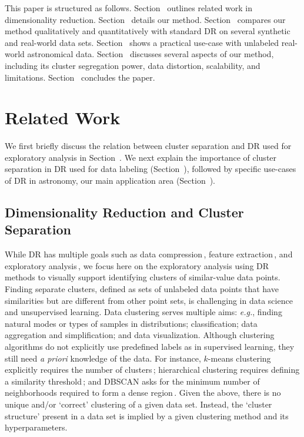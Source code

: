 \documentclass[sagev,Afour,times]{sagej}
\begin{document}
This paper is structured as follows. Section~ outlines related work in dimensionality reduction. Section~ details our method. Section~ compares our method qualitatively and quantitatively with standard DR on several synthetic and real-world data sets. Section~ shows a practical use-case with unlabeled real-world astronomical data. Section~ discusses several aspects of our method, including its cluster segregation power, data distortion, scalability, and limitations. Section~ concludes the paper.

\section{Related Work} \label{sec:relatedWork}
%
We first briefly discuss the relation between cluster separation and DR used for exploratory analysis in Section~. We next explain the importance of cluster separation in DR used for data labeling (Section~), followed by specific use-cases of DR in astronomy, our main application area (Section~). 
    
\subsection{Dimensionality Reduction and Cluster Separation}
\label{sec:relatedwork:VCS}
While DR has multiple goals such as data compression\,\cite{ae_survey}, feature extraction\,\cite{bleha91}, and exploratory analysis\,\cite{nonato18}, we focus here on the exploratory analysis using DR methods to visually support identifying clusters of similar-value data points. Finding separate clusters, defined as sets of unlabeled data points that have similarities but are different from other point sets, is challenging in data science and unsupervised learning. Data clustering serves multiple aims: \emph{e.g.}, finding natural modes or types of samples in distributions; classification; data aggregation and simplification; and data visualization. Although clustering algorithms do not explicitly use predefined labels as in supervised learning, they still need \emph{a priori} knowledge of the data. For instance, $k$-means clustering explicitly requires the number of clusters\,\cite{kmeans1967}; hierarchical clustering requires defining a similarity threshold\,\cite{hierarchicalClust}; and DBSCAN asks for the minimum number of neighborhoods required to form a dense region\,\cite{dbscan1972, cluster_berkhin2006survey}. Given the above, there is no unique and/or `correct' clustering of a given data set. Instead, the `cluster structure' present in a data set is implied by a given clustering method and its hyperparameters.
\end{document}

